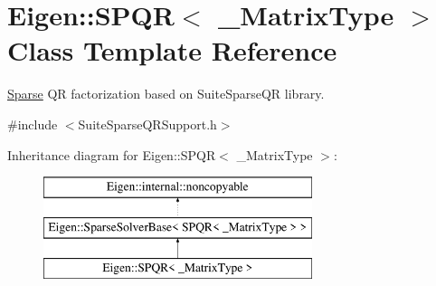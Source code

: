 \hypertarget{class_eigen_1_1_s_p_q_r}{}\section{Eigen\+::S\+P\+QR$<$ \+\_\+\+Matrix\+Type $>$ Class Template Reference}
\label{class_eigen_1_1_s_p_q_r}


\mbox{\hyperlink{struct_eigen_1_1_sparse}{Sparse}} QR factorization based on Suite\+Sparse\+QR library.  




{\ttfamily \#include $<$Suite\+Sparse\+Q\+R\+Support.\+h$>$}

Inheritance diagram for Eigen\+::S\+P\+QR$<$ \+\_\+\+Matrix\+Type $>$\+:\begin{figure}[H]
\begin{center}
\leavevmode
\includegraphics[height=3.000000cm]{class_eigen_1_1_s_p_q_r}
\end{center}
\end{figure}
